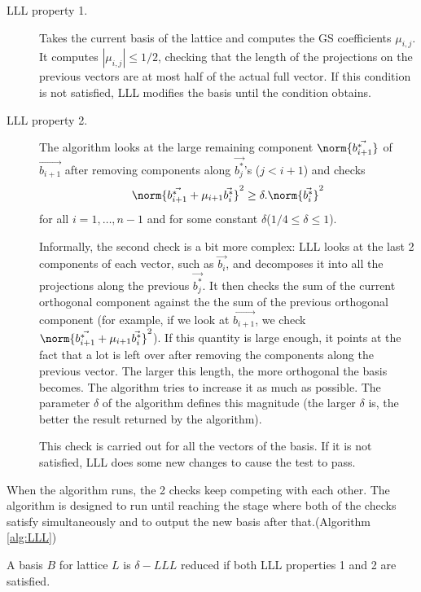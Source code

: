 \begin{description}
\item [LLL property 1.] Takes the current basis of the lattice and computes the
  GS coefficients $\mu_{i,j}$. It computes $|\mu_{i,j}| \leq 1/2$, checking that the
  length of the projections on the previous vectors are at most half of the
  actual full vector. If this condition is not satisfied, LLL modifies the basis
  until the condition obtains.
\item [LLL property 2.] The algorithm looks at the large remaining component
  $\norm{\vec{b_{i+1}^*}}$ of $\vec{b_{i+1}}$ after removing components along
  $\vec{b_j^*}$'s ($j < i + 1$) and checks
  \[
    \norm{\vec{b_{i+1}^*}+\mu_{i+1}\vec{b_i^*}}^2 \geq \delta
    . \norm{\vec{b_i^*}}^2
  \]
  for all $i=1,\dots,n-1$ and for some constant
  $\delta$($1/4 \leq \delta \leq 1$).

  Informally, the second check is a bit more complex: LLL looks at the last 2
  components of each vector, such as $\vec{b_i}$, and decomposes it
  into all the projections along the previous $\vec{b_j^*}$. It then checks the 
  sum of the current orthogonal component against the the sum of the previous orthogonal component (for example, if
  we look at $\vec{b_{i+1}}$, we check
  $\norm{\vec{b_{i+1}^*}+\mu_{i+1}\vec{b_i^*}}^2$). If this quantity is large
  enough, it points at the fact that a lot is left over after removing the
  components along the previous vector. The larger this length, the more
  orthogonal the basis becomes. The algorithm tries to increase it as much as possible. The
  parameter $\delta$ of the algorithm defines this magnitude (the larger
  $\delta$ is, the better the result returned by the algorithm).

  This check is carried out for all the vectors of the basis. If it is not
  satisfied, LLL does some new changes to cause the test to pass.
\end{description}

When the algorithm runs, the 2 checks keep competing with each
other. The algorithm is designed to run until reaching the stage where both of the checks satisfy
simultaneously and to output the new basis after that.(Algorithm
\ref{alg:LLL})
\begin{definition}
  A basis $B$ for lattice $L$ is $\delta-LLL$ reduced if both LLL properties 1
  and 2 are satisfied.
  \label{def:LLL}
\end{definition}

